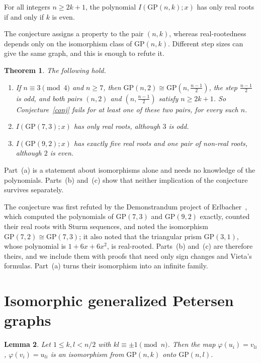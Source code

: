 \documentclass[11pt]{amsart}
\newtheorem{theorem}{Theorem}[section]
\newtheorem{lemma}[theorem]{Lemma}
\theoremstyle{definition}
\newenvironment{conjecture}[1]{\renewcommand{\theinnerconj}{#1}\innerconj}{\endinnerconj}
\theoremstyle{remark}
\numberwithin{equation}{section}
\newcommand{\GP}{\mathrm{GP}}
\begin{document}
\begin{conjecture}{4.1 of \cite{Pandey}}\label{conj}
For all integers $n\ge 2k+1$, the polynomial $I(\GP(n,k);x)$ has only real roots if and only if $k$ is even.
\end{conjecture}

The conjecture assigns a property to the pair $(n,k)$, whereas real-rootedness depends only on the isomorphism class of $\GP(n,k)$. Different step sizes can give the same graph, and this is enough to refute it.

\begin{theorem}\label{thm:main}
The following hold.
\begin{enumerate}
\item[(a)] If $n\equiv 3\pmod 4$ and $n\ge 7$, then $\GP(n,2)\cong\GP(n,\tfrac{n-1}2)$, the step $\tfrac{n-1}2$ is odd, and both pairs $(n,2)$ and $(n,\tfrac{n-1}2)$ satisfy $n\ge 2k+1$. So Conjecture~\ref{conj} fails for at least one of these two pairs, for every such $n$.
\item[(b)] $I(\GP(7,3);x)$ has only real roots, although $3$ is odd.
\item[(c)] $I(\GP(9,2);x)$ has exactly five real roots and one pair of non-real roots, although $2$ is even.
\end{enumerate}
\end{theorem}

Part~(a) is a statement about isomorphisms alone and needs no knowledge of the polynomials. Parts~(b) and~(c) show that neither implication of the conjecture survives separately.

The conjecture was first refuted by the Demonstrandum project of Erlbacher~\cite{Dem}, which computed the polynomials of $\GP(7,3)$ and $\GP(9,2)$ exactly, counted their real roots with Sturm sequences, and noted the isomorphism $\GP(7,2)\cong\GP(7,3)$; it also noted that the triangular prism $\GP(3,1)$, whose polynomial is $1+6x+6x^2$, is real-rooted. Parts~(b) and~(c) are therefore theirs, and we include them with proofs that need only sign changes and Vieta's formulas. Part~(a) turns their isomorphism into an infinite family.

\section{Isomorphic generalized Petersen graphs}

\begin{lemma}\label{lem:iso}
Let $1\le k,l<n/2$ with $kl\equiv\pm1\pmod n$. Then the map $\varphi(u_i)=v_{li}$, $\varphi(v_i)=u_{li}$ is an isomorphism from $\GP(n,k)$ onto $\GP(n,l)$.
\end{lemma}
\end{document}

